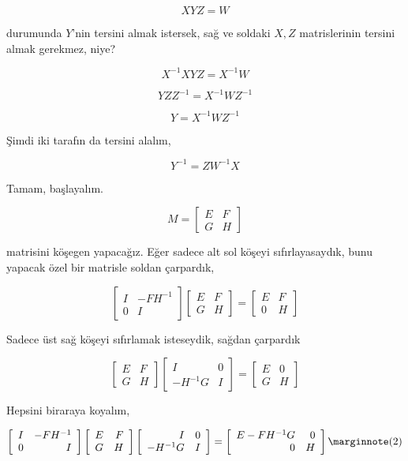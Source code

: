 \documentclass[12pt,fleqn]{article}\usepackage{../../common}
\begin{document}
$$ XYZ = W $$

durumunda $Y$'nin tersini almak istersek, sağ ve soldaki $X,Z$
matrislerinin tersini almak gerekmez, niye?

$$ X^{-1}XYZ = X^{-1}W $$

$$ YZZ^{-1} = X^{-1}WZ^{-1} $$

$$ Y = X^{-1}WZ^{-1} $$

Şimdi iki tarafın da tersini alalım, 

$$ Y^{-1} = ZW^{-1}X $$

Tamam, başlayalım. 

$$ M = 
\left[\begin{array}{rr}
E & F \\
G & H
\end{array}\right] 
 $$

matrisini köşegen yapacağız. Eğer sadece alt sol köşeyi sıfırlayasaydık, 
bunu yapacak özel bir matrisle soldan çarpardık,

$$ 
\left[\begin{array}{rr}
I & -FH^{-1} \\
0 & I
\end{array}\right] 
\left[\begin{array}{rr}
E & F \\
G & H
\end{array}\right] = 
\left[\begin{array}{rr}
E & F \\
0 & H
\end{array}\right] 
 $$

Sadece üst sağ köşeyi sıfırlamak isteseydik, sağdan çarpardık

$$ 
\left[\begin{array}{rr}
E & F \\
G & H
\end{array}\right] 
\left[\begin{array}{rr}
I & 0 \\
-H^{-1}G & I
\end{array}\right] 
=
\left[\begin{array}{rr}
E & 0 \\
G & H
\end{array}\right] 
 $$

Hepsini biraraya koyalım, 

$$ 
\left[\begin{array}{rr}
I & -FH^{-1} \\
0 & I
\end{array}\right] 
\left[\begin{array}{rr}
E & F \\
G & H
\end{array}\right] 
\left[\begin{array}{rr}
I & 0 \\
-H^{-1}G & I
\end{array}\right] 
= 
\left[\begin{array}{rr}
E-FH^{-1}G & 0 \\
0 & H
\end{array}\right] 
\mlabel{2}
 $$
\end{document}
